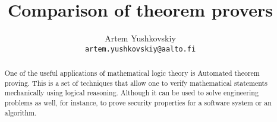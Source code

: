\documentclass[article]{aaltoseries}
\begin{document}

\title{Comparison of theorem provers}

\author{Artem Yushkovskiy
\\\textnormal{\texttt{artem.yushkovskiy@aalto.fi}}}


\maketitle


\begin{abstract}
One of the useful applications of mathematical logic theory is Automated theorem proving. This is a set of techniques that allow one to verify mathematical statements mechanically using logical reasoning. Although it can be used to solve engineering problems as well, for instance, to prove security properties for a software system or an algorithm.

\end{abstract}
\end{document}
